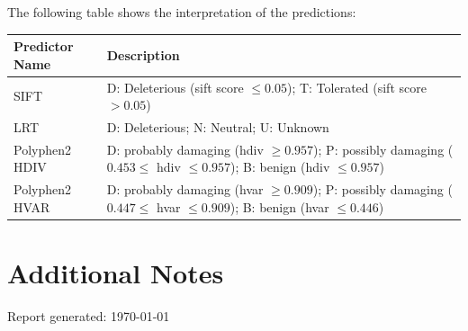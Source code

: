 \documentclass[10pt]{article}
\begin{document}
\bigskip
\noindent The following table shows the interpretation of the predictions:
\newline
\footnotesize
\def\arraystretch{1.5}
\begin{tabular}{|l|p{5.75in}|}
  \hline
  \textbf{Predictor Name} & \textbf{Description} \\ \hline
  SIFT & D: Deleterious (sift score $\leq 0.05$); T: Tolerated (sift score $> 0.05$) \\ \hline
  LRT & D: Deleterious; N: Neutral; U: Unknown \\ \hline
  Polyphen2 HDIV & D: probably damaging (hdiv $\geq 0.957$); P: possibly damaging ($0.453 \leq$ hdiv $\leq 0.957$); B: benign (hdiv $\leq 0.957$) \\ \hline
  Polyphen2 HVAR & D: probably damaging (hvar $\geq 0.909$); P: possibly damaging ($0.447 \leq$ hvar $\leq 0.909$); B: benign (hvar $\leq 0.446$) \\ \hline
\end{tabular}

\normalsize

\bigskip

\section*{Additional Notes}
\noindent {}
\bigskip
\newline \noindent Report generated: \today
\end{document}

